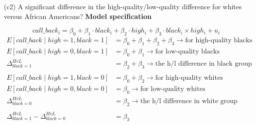 \documentclass[
  10pt,
  ignorenonframetext,
]{beamer}
\begin{document}
\begin{frame}{(c2) A significant difference in the
high-quality/low-quality difference for whites versus African
Americans?}
\protect\hypertarget{c2-a-significant-difference-in-the-high-qualitylow-quality-difference-for-whites-versus-african-americans}{}
\textbf{Model specification}

\[
call\_back_i = \beta_0 + \beta_1\cdot black_i + \beta_2 \cdot high_i + \beta_3 \cdot black_i \times high_i+ u_i
\] \small \[
\begin{aligned}
E[call\_back \mid high = 1, black = 1] &= \beta_0 + \beta_1 + \beta_2 + \beta_3 \rightarrow \text{for high-quality blacks}\\
E[call\_back \mid high = 0, black = 1] &= \beta_0 + \beta_1 \rightarrow \text{for low-quality blacks}\\
\Delta^{HvL}_{black = 1} &= \beta_2 + \beta_3 \rightarrow \text{the h/l difference in black group}\\
\\
E[call\_back \mid high = 1, black = 0] &= \beta_0 + \beta_2 \rightarrow \text{for high-quality whites}\\
E[call\_back \mid high = 0, black = 0] &= \beta_0 \rightarrow \text{for low-quality whites}\\
\Delta^{HvL}_{black = 0} &= \beta_2 \rightarrow \text{the h/l difference in white group}\\
\\
\Delta^{HvL}_{black = 1} - \Delta^{HvL}_{black = 0} &= \beta_3
\end{aligned}
\]
\end{frame}
\end{document}
